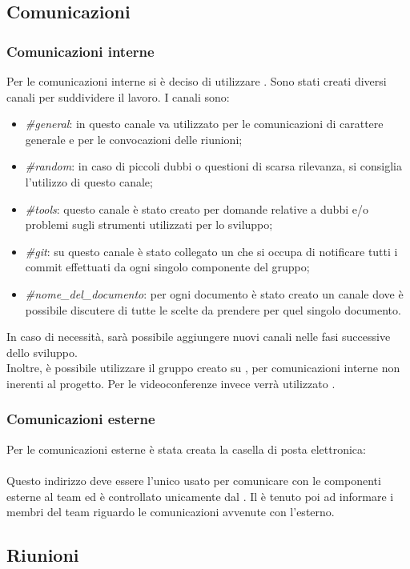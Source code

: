 \subsection{Comunicazioni}
	\subsubsection{Comunicazioni interne}
	Per le comunicazioni interne si è deciso di utilizzare . Sono stati creati diversi canali per suddividere il lavoro. I canali sono:
	\begin{itemize}
		\item \textit{\#general}: in questo canale va utilizzato per le comunicazioni di carattere generale e per le convocazioni delle riunioni; 
		\item \textit{\#random}: in caso di piccoli dubbi o questioni di scarsa rilevanza, si consiglia l'utilizzo di questo canale; 
		\item \textit{\#tools}: questo canale è stato creato per domande relative a dubbi e/o problemi sugli strumenti utilizzati per lo sviluppo;
		\item \textit{\#git}: su questo canale è stato collegato un  che si occupa di notificare tutti i commit effettuati da ogni singolo componente del gruppo;
		\item \textit{\#nome\_del\_documento}: per ogni documento è stato creato un canale dove è possibile discutere di tutte le scelte da prendere per quel singolo documento.
	\end{itemize}
	In caso di necessità, sarà possibile aggiungere nuovi canali nelle fasi successive dello sviluppo. \\
	Inoltre, è possibile utilizzare il gruppo creato su , per comunicazioni interne non inerenti al progetto. Per le videoconferenze invece verrà utilizzato .
	\subsubsection{Comunicazioni esterne}
	Per le comunicazioni esterne è stata creata la casella di posta elettronica: \\
	\highlight{\EMAIL}\\
	Questo indirizzo deve essere l'unico usato per comunicare con le componenti esterne al team ed è controllato unicamente dal \gl{\RES}. Il \RES è tenuto poi ad informare i membri del team riguardo le comunicazioni avvenute con l'esterno.
\subsection{Riunioni}
